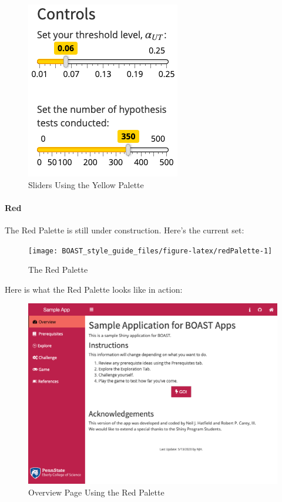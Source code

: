 \documentclass[
]{book}
\begin{document}
\begin{figure}

{\centering \includegraphics{images/colorThemes/yellowSliders} 

}

\caption{Sliders Using the Yellow Palette}\label{fig:yellowAction3}
\end{figure}

\hypertarget{red}{%
\paragraph{Red}\label{red}}

The Red Palette is still under construction. Here's the current set:

\begin{figure}

{\centering \texttt{[image: BOAST\_style\_guide\_files/figure-latex/redPalette-1]} 

}

\caption{The Red Palette}\label{fig:redPalette}
\end{figure}

Here is what the Red Palette looks like in action:

\begin{figure}

{\centering \includegraphics[width=14in]{images/colorThemes/redOverview} 

}

\caption{Overview Page Using the Red Palette}\label{fig:redAction1}
\end{figure}
\end{document}
